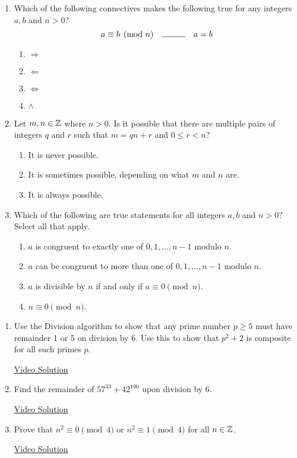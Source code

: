 \pagestyle{empty}


\begin{enumerate}
  \item Which of the following connectives makes the following true for any integers $a,b$ and $n>0$?
  \[
  	a\equiv b\pmod n \quad \rule{1cm}{0.15mm} \quad a=b
  \]
  \begin{enumerate}
    \item $\Longrightarrow$
		\item $\Longleftarrow$
		\item $\iff$
		\item $\land$
	\end{enumerate}
    
	\item Let $m,n\in\mathbb{Z}$ where $n>0$. Is it possible that there are multiple pairs of integers $q$ and $r$ such that $m=qn+r$ and $0\le r<n$?
	\begin{enumerate}
		\item It is never possible.
		\item It is sometimes possible, depending on what $m$ and $n$ are.
		\item It is always possible.
	\end{enumerate}
    
	\item Which of the following are true statements for all integers $a,b$ and $n>0$? Select all that apply.
	\begin{enumerate}
		\item $a$ is congruent to exactly one of $0,1,\ldots,n-1$ modulo $n$.
		\item $a$ can be congruent to more than one of $0,1,\ldots,n-1$ modulo $n$.
	  \item $a$ is divisible by $n$  if and only if $a\equiv 0\pmod n$.
    \item $n\equiv 0\pmod n$.
  \end{enumerate}
\end{enumerate}



\begin{enumerate}
	\item Use the Division algorithm to show that any prime number $p\ge 5$ must have remainder 1 or 5 on division by 6. Use this to show that $p^2+2$ is composite for all such primes $p$.
    
  \href{https://youtu.be/5kSRSP5FHKw}{Video Solution}
    
  \item Find the remainder of $57^{33}+42^{100}$ upon division by 6.
    
  \href{https://youtu.be/BQHAWJmsEAU}{Video Solution}
    
  \item Prove that $n^2\equiv 0\pmod 4$ or $n^2\equiv 1\pmod 4$ for all $n\in\mathbb{Z}$.
    
  \href{https://youtu.be/st9pXz2agyw}{Video Solution}
\end{enumerate}